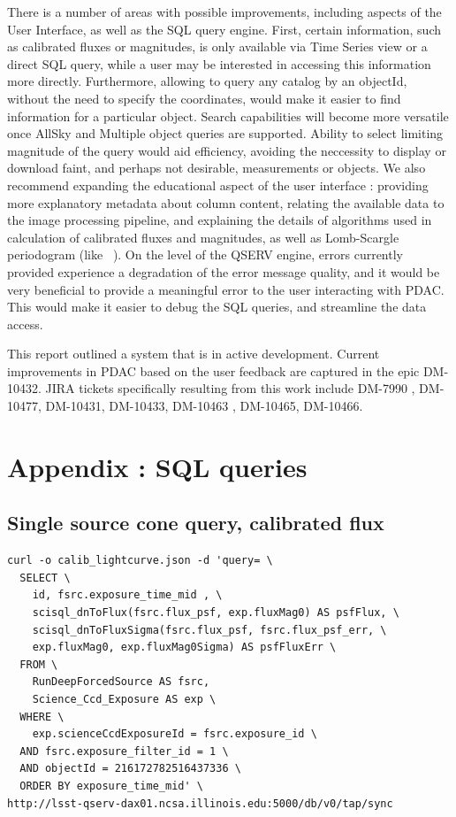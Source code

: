 \documentclass[DM,lsstdraft,toc]{lsstdoc}
\begin{document}
There is a number of areas with possible improvements,  including aspects of the User Interface, as well as the SQL query engine. First, certain information, such as calibrated fluxes or magnitudes, is only available via Time Series view or a direct SQL query, while a user may be interested in accessing this information more directly.  Furthermore, allowing to query any catalog by an objectId, without the need to specify the coordinates, would make it easier to find information for a particular object.  Search capabilities will become more versatile once AllSky and Multiple object queries are supported.  Ability to select limiting magnitude of the query would aid efficiency, avoiding the neccessity to display or download faint, and perhaps not desirable, measurements or objects.  We also recommend expanding the educational aspect of the user interface  : providing more explanatory metadata about column content, relating the available data to the image processing pipeline, and explaining the details of algorithms used in calculation of calibrated fluxes and magnitudes, as well as Lomb-Scargle periodogram (like ~\cite{2017arXiv170309824V}). On the level of the QSERV engine,  errors currently provided  experience a degradation of the error message quality, and it would be very beneficial to provide a meaningful error to the user interacting with PDAC. This would make it easier to debug the SQL queries, and streamline the data access.

This report outlined a system that is in active development. Current improvements in PDAC based on the user feedback are captured in the epic DM-10432. JIRA tickets specifically resulting from this work include DM-7990 , DM-10477, DM-10431, DM-10433, DM-10463 , DM-10465, DM-10466.

\appendix
\section{Appendix : SQL queries}

\subsection{Single source cone query, calibrated flux}
\label{sec:sql_single_flux}
\begin{lstlisting}
curl -o calib_lightcurve.json -d 'query= \
  SELECT \
    id, fsrc.exposure_time_mid , \
    scisql_dnToFlux(fsrc.flux_psf, exp.fluxMag0) AS psfFlux, \
    scisql_dnToFluxSigma(fsrc.flux_psf, fsrc.flux_psf_err, \
    exp.fluxMag0, exp.fluxMag0Sigma) AS psfFluxErr \
  FROM \
    RunDeepForcedSource AS fsrc,
    Science_Ccd_Exposure AS exp \
  WHERE \
    exp.scienceCcdExposureId = fsrc.exposure_id \
  AND fsrc.exposure_filter_id = 1 \
  AND objectId = 216172782516437336 \
  ORDER BY exposure_time_mid' \
http://lsst-qserv-dax01.ncsa.illinois.edu:5000/db/v0/tap/sync
\end{lstlisting}
\end{document}
